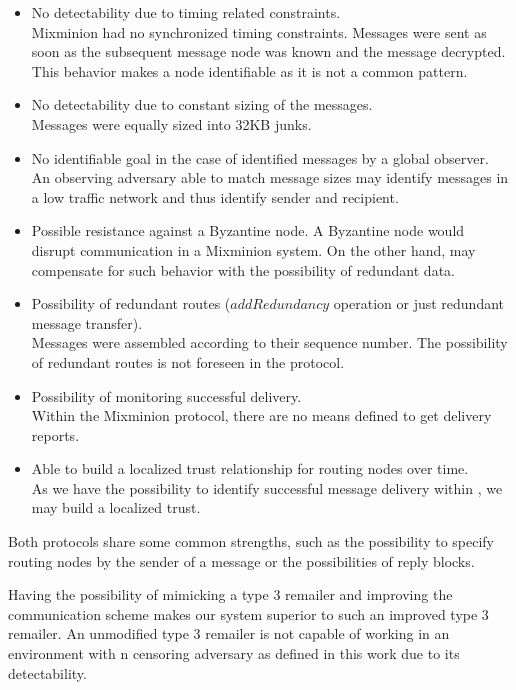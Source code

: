 \begin{itemize}
	\item No detectability due to timing related constraints.\\
	      Mixminion had no synchronized timing constraints. Messages were sent as soon as the subsequent message node was known and the message decrypted. This behavior makes a node identifiable as it is not a common pattern.
	\item No detectability due to constant sizing of the messages.\\
	      Messages were equally sized into 32KB junks.
	\item No identifiable goal in the case of identified messages by a global observer.\\
		  An observing adversary able to match message sizes may identify messages in a low traffic network and thus identify sender and recipient. 
	\item Possible resistance against a Byzantine node.
	      A Byzantine node would disrupt communication in a Mixminion system. On the other hand, \MessageVortex{} may compensate for such behavior with the possibility of redundant data.
	\item Possibility of redundant routes ($addRedundancy$ operation or just redundant message transfer).\\
	      Messages were assembled according to their sequence number. The possibility of redundant routes is not foreseen in the protocol.
	\item Possibility of monitoring successful delivery.\\
	      Within the Mixminion protocol, there are no means defined to get delivery reports.
	\item Able to build a localized trust relationship for routing nodes over time.\\
	      As we have the possibility to identify successful message delivery within \MessageVortex{}, we may build a localized trust.
\end{itemize}

Both protocols share some common strengths, such as the possibility to specify routing nodes by the sender of a message or the possibilities of reply blocks. 

Having the possibility of mimicking a type 3 remailer and improving the communication scheme makes our system superior to such an improved type 3 remailer. An unmodified type 3 remailer is not capable of working in an environment with n censoring adversary as defined in this work due to its detectability. 

